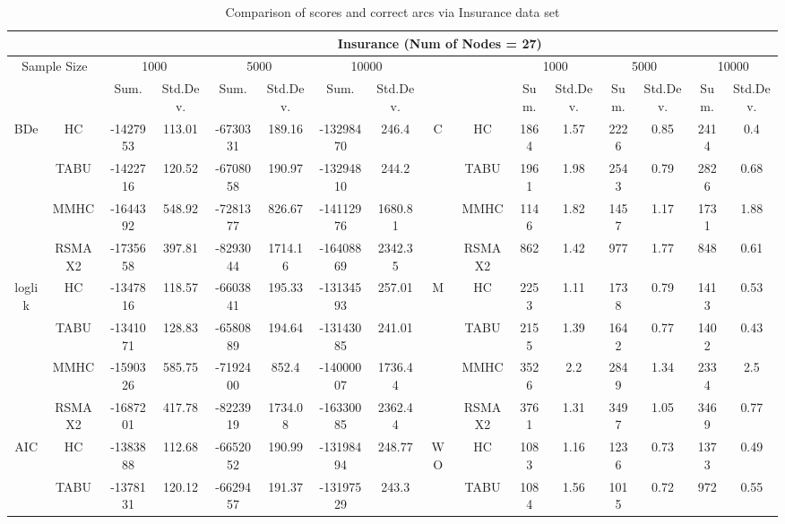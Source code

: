 \begin{table}[p]																										
\centering	\caption{Comparison of scores and correct arcs via Insurance data set}	\tiny																						
{\tabcolsep=0.01in																										
\begin{tabular}{cc||cc|cc|cc||cc|cc|cc|cc}																										
\hline																										
&	&	\multicolumn{14}{c}{Insurance	(Num	of	Nodes	=	27)}\tabularnewline																			
\hline																										
\multicolumn{2}{c||}{Sample	Size}	&	\multicolumn{2}{c|}{1000}	&	\multicolumn{2}{c|}{5000}	&	\multicolumn{2}{c||}{10000}	&	&	&	\multicolumn{2}{c|}{1000}	&	\multicolumn{2}{c|}{5000}	&	\multicolumn{2}{c}{10000}\tabularnewline											
\hline																										
&	&	Sum.	&	Std.Dev.	&	Sum.	&	Std.Dev.	&	Sum.	&	Std.Dev.	&	&	&	Sum.	&	Std.Dev.	&	Sum.	&	Std.Dev.	&	Sum.	&	Std.Dev.\tabularnewline
\hline																										
\hline																										
\multirow{4}{*}{BDe} & HC &	-1427953 & 	113.01 & 	-6730331 & 	189.16 & 	-13298470 & 	246.4 & 	\multirow{4}{*}{C} & HC &	1864 & 	1.57 & 	2226 & 	0.85 & 	2414 & 	0.4\tabularnewline													
& TABU &	-1422716 & 	120.52 & 	-6708058 & 	190.97 & 	-13294810 & 	244.2 & 	& TABU &	1961 & 	1.98 & 	2543 & 	0.79 & 	2826 & 	0.68\tabularnewline													
& MMHC &	-1644392 & 	548.92 & 	-7281377 & 	826.67 & 	-14112976 & 	1680.81 & 	& MMHC &	1146 & 	1.82 & 	1457 & 	1.17 & 	1731 & 	1.88\tabularnewline													
& RSMAX2 &	-1735658 & 	397.81 & 	-8293044 & 	1714.16 & 	-16408869 & 	2342.35 & 	& RSMAX2 &	862 & 	1.42 & 	977 & 	1.77 & 	848 & 	0.61\tabularnewline													
\hline																										
\multirow{4}{*}{loglik} & HC &	-1347816 & 	118.57 & 	-6603841 & 	195.33 & 	-13134593 & 	257.01 & 	\multirow{4}{*}{M} & HC &	2253 & 	1.11 & 	1738 & 	0.79 & 	1413 & 	0.53\tabularnewline													
& TABU &	-1341071 & 	128.83 & 	-6580889 & 	194.64 & 	-13143085 & 	241.01 & 	& TABU &	2155 & 	1.39 & 	1642 & 	0.77 & 	1402 & 	0.43\tabularnewline													
& MMHC &	-1590326 & 	585.75 & 	-7192400 & 	852.4 & 	-14000007 & 	1736.44 & 	& MMHC &	3526 & 	2.2 & 	2849 & 	1.34 & 	2334 & 	2.5\tabularnewline													
& RSMAX2 &	-1687201 & 	417.78 & 	-8223919 & 	1734.08 & 	-16330085 & 	2362.44 & 	& RSMAX2 &	3761 & 	1.31 & 	3497 & 	1.05 & 	3469 & 	0.77\tabularnewline													
\hline																										
\multirow{4}{*}{AIC} & HC &	-1383888 & 	112.68 & 	-6652052 & 	190.99 & 	-13198494 & 	248.77 & 	\multirow{4}{*}{WO} & HC &	1083 & 	1.16 & 	1236 & 	0.73 & 	1373 & 	0.49\tabularnewline													
& TABU &	-1378131 & 	120.12 & 	-6629457 & 	191.37 & 	-13197529 & 	243.3 & 	& TABU &	1084 & 	1.56 & 	1015 & 	0.72 & 	972 & 	0.55\tabularnewline													

\end{tabular}}
\end{table}
